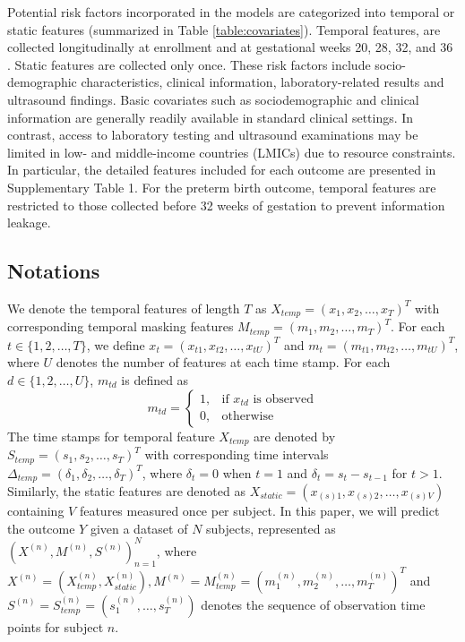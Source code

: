 \documentclass[fleqn,10pt]{wlscirep}
\begin{document}
Potential risk factors incorporated in the models are categorized into temporal or static features (summarized in Table \ref{table:covariates}). Temporal features, are collected longitudinally at enrollment and at gestational weeks 20, 28, 32, and 36 \cite{wei2026_unpub}. Static features are collected only once. These risk factors include socio-demographic characteristics, clinical information, laboratory-related results and ultrasound findings. Basic covariates such as sociodemographic and clinical information are generally readily available in standard clinical settings. In contrast, access to laboratory testing and ultrasound examinations may be limited in low- and middle-income countries (LMICs) due to resource constraints. In particular, the detailed features included for each outcome are presented in Supplementary Table 1. For the preterm birth outcome, temporal features are restricted to those collected before 32 weeks of gestation to prevent information leakage.

\subsection*{Notations}
We denote the temporal features of length $T$ as $X_{temp}=(x_1, x_2,\dots, x_T)^T$ with corresponding temporal masking features $M_{temp}=(m_1, m_2,\dots, m_T)^T$. For each $t \in \{1, 2, \dots, T\}$, we define $x_t=(x_{t1}, x_{t2},\dots,x_{tU})^T$ and $m_t=(m_{t1}, m_{t2},\dots,m_{tU})^T$, where $U$ denotes the number of features at each time stamp. For each $d \in \{1, 2, \dots, U\}$, $m_{td}$ is defined as 
\begin{equation}
m_{td} = 
\begin{cases}
1, & \text{if } x_{td} \text{ is observed}\\
0, & \text{otherwise}
\end{cases}
\tag{1}
\end{equation}
The time stamps for temporal feature $X_{temp}$ are denoted by $S_{temp}=(s_1, s_2,\dots, s_T)^T$ with corresponding time intervals $\Delta_{temp}=(\delta_1, \delta_2,\dots, \delta_T)^T$, where $\delta_t = 0$ when $t=1$ and $\delta_t = s_t-s_{t-1}$ for $t>1$.\\
Similarly, the static features are denoted as $X_{static}=(x_{(s)1}, x_{(s)2},\dots,x_{(s)V})$ containing $V$ features measured once per subject. In this paper, we will predict the outcome $Y$ given a dataset of $N$ subjects, represented as $(X^{(n)},M^{(n)},S^{(n)})^N_{n=1}$, where $X^{(n)}=(X^{(n)}_{temp}, X^{(n)}_{static}), M^{(n)} = M^{(n)}_{temp} = (m^{(n)}_1, m^{(n)}_2,\dots, m^{(n)}_T)^T$ and $S^{(n)} = S^{(n)}_{temp} = (s^{(n)}_1,\dots,s^{(n)}_T)$ denotes the sequence of observation time points for subject $n$.
\end{document}
